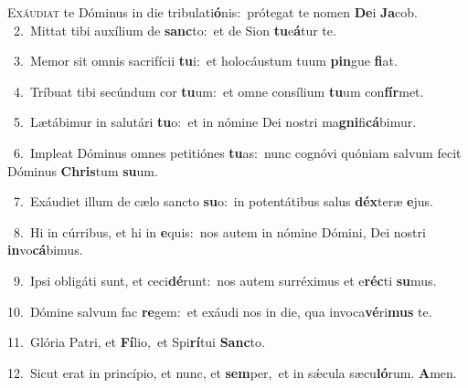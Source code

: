 \lettrine{\initial\textcolor{\initialcolor}{E}}{xáudiat} te Dóminus in die tribulati\-\textbf{ó}\-nis:~\star prótegat te nomen \textbf{De}\-i \textbf{Ja}\-cob.\\
{\numbfont\textcolor{\numbcolor}{~2.}}~Mittat tibi auxílium de \textbf{sanc}\-to:~\star et de Sion \textbf{tu}\-e\-\textbf{á}\-tur te.\par
{\numbfont\textcolor{\numbcolor}{~3.}}~Memor sit omnis sacrifícii \textbf{tu}\-i:~\star et holocáustum tuum \textbf{pin}\-gue \textbf{fi}\-at.\par
{\numbfont\textcolor{\numbcolor}{~4.}}~Tríbuat tibi secúndum cor \textbf{tu}\-um:~\star et omne consílium \textbf{tu}\-um con\-\textbf{fír}\-met.\par
{\numbfont\textcolor{\numbcolor}{~5.}}~Lætábimur in salutári \textbf{tu}\-o:~\star et in nómine Dei nostri ma\-\textbf{gni}\-fi\-\textbf{cá}\-bimur.\par
{\numbfont\textcolor{\numbcolor}{~6.}}~Impleat Dóminus omnes petitiónes \textbf{tu}\-as:~\star nunc cognóvi quóniam salvum fecit Dóminus \textbf{Chris}\-tum \textbf{su}\-um.\par
{\numbfont\textcolor{\numbcolor}{~7.}}~Exáudiet illum de cælo sancto \textbf{su}\-o:~\star in potentátibus salus \textbf{déx}\-teræ \textbf{e}\-jus.\par
{\numbfont\textcolor{\numbcolor}{~8.}}~Hi in cúrribus, et hi in \textbf{e}\-quis:~\star nos autem in nómine Dómini, Dei nostri \textbf{in}\-vo\-\textbf{cá}\-bimus.\par
{\numbfont\textcolor{\numbcolor}{~9.}}~Ipsi obligáti sunt, et ceci\-\textbf{dé}\-runt:~\star nos autem surréximus et e\-\textbf{réc}\-ti \textbf{su}\-mus.\par
{\numbfont\textcolor{\numbcolor}{10.}}~Dómine salvum fac \textbf{re}\-gem:~\star et exáudi nos in die, qua invoca\-\textbf{vé}\-ri\textbf{mus} te.\par
{\numbfont\textcolor{\numbcolor}{11.}}~Glória Patri, et \textbf{Fí}\-lio,~\star et Spi\-\textbf{rí}\-tui \textbf{Sanc}\-to.\par
{\numbfont\textcolor{\numbcolor}{12.}}~Sicut erat in princípio, et nunc, et \textbf{sem}\-per,~\star et in sǽcula sæcu\-\textbf{ló}\-rum. \textbf{A}\-men.\par
